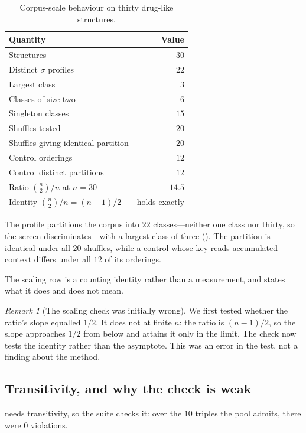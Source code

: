 \documentclass[11pt,twocolumn,a4paper]{article}
\theoremstyle{upthm}
\theoremstyle{definition}
\theoremstyle{remark}
\newtheorem{remark}[theorem]{Remark}
\newcommand{\sep}{\sigma}
\begin{document}
\begin{table}[htbp]
\centering\small
\caption{Corpus-scale behaviour on thirty drug-like structures.}
\label{tab:corpus}
\begin{tabular}{@{}lr@{}}
\toprule
Quantity & Value\\
\midrule
Structures & $30$\\
Distinct $\sep$ profiles & $22$\\
Largest class & $3$\\
Classes of size two & $6$\\
Singleton classes & $15$\\
\midrule
Shuffles tested & $20$\\
Shuffles giving identical partition & $20$\\
\midrule
Control orderings & $12$\\
Control distinct partitions & $12$\\
\midrule
Ratio $\binom{n}{2}/n$ at $n=30$ & $14.5$\\
Identity $\binom{n}{2}/n=(n-1)/2$ & holds exactly\\
\bottomrule
\end{tabular}
\end{table}

The profile partitions the corpus into $22$ classes---neither one class
nor thirty, so the screen discriminates---with a largest class of three
(). The partition is identical under all $20$ shuffles,
while a control whose key reads accumulated context differs under all
$12$ of its orderings.

The scaling row is a counting identity rather than a measurement, and
 states what it does and does not mean.

\begin{remark}[The scaling check was initially wrong]
\label{rem:asymptote}
We first tested whether the ratio's slope equalled $1/2$. It does not at
finite $n$: the ratio is $(n-1)/2$, so the slope approaches $1/2$ from
below and attains it only in the limit. The check now tests the identity
rather than the asymptote. This was an error in the test, not a finding
about the method.
\end{remark}

\subsection{Transitivity, and why the check is weak}

 needs transitivity, so the suite checks it: over the
$10$ triples the pool admits, there were $0$ violations.
\end{document}
